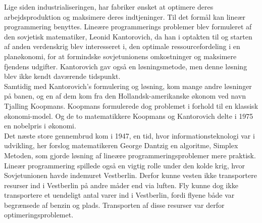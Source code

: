 Lige siden industrialiseringen, har fabriker ønsket at optimere deres arbejdsproduktion og maksimere deres indtjeninger. 
Til det formål kan lineær programmering benyttes.
Lineære programmerings problemer blev formuleret af den sovjetisk matematiker, Leonid Kantorovich, da han i optakten til og starten af anden verdenskrig blev  interesseret i, den optimale ressourcefordeling i en planøkonomi, for at formindske sovjetunionens omkostninger og maksimere fjendens udgifter. Kantorovich gav også en løsningsmetode, men denne løsning blev ikke kendt daværende tidspunkt.\\
Samtidig med Kantorovich's formulering og løsning, kom  mange andre løsninger på banen, og en af dem kom fra den Hollandsk-amerikanske økonom ved navn Tjalling Koopmans. Koopmans formulerede dog problemet i forhold til en klassisk økonomi-model. 
Og de to matematikkere Koopmans og Kantorovich delte i 1975 en nobelpris i økonomi.\\
Det næste store gennembrud kom i 1947, en tid, hvor informationsteknologi var i udvikling, her forslog matematikeren George Dantzig  en algoritme, Simplex Metoden, som gjorde løsning af lineære programmeringsproblemer mere praktisk. 
\\%
Lineær programmering spillede også en vigtig rolle under den kolde krig, hvor Sovjetunionen havde indemuret Vestberlin.
Derfor kunne vesten ikke transportere resurser ind i Vestberlin på andre måder end via luften.
Fly kunne dog ikke transportere et uendeligt antal varer ind i Vestberlin, fordi flyene både var begrænsede af benzin og plads. 
Transporten af disse resurser var derfor optimeringsproblemet. \cite{bert} \cite{lay}